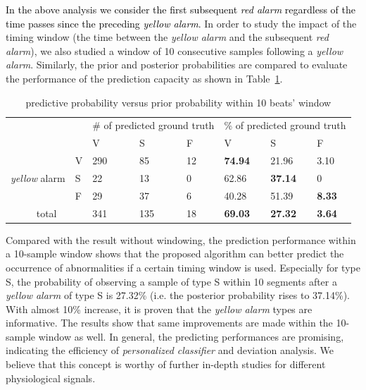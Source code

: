 \textcolor{black}{In the above analysis we consider the first subsequent \textit{red alarm} regardless of the time passes since the preceding \textit{yellow alarm}.} In order to study the impact of the timing window (the time between the \textit{yellow alarm} and the subsequent \textit{red alarm}), we also studied a window of 10 consecutive samples following a \textit{yellow alarm}. Similarly, the prior and posterior probabilities are compared to evaluate the performance of the prediction capacity as shown in Table~\ref{table:pred10}. %


\begin{table}[t]
\centering
\caption{predictive probability versus prior probability within 10 beats' window}
\label{table:pred10}
\begin{tabular}{|c|l|l|l|l||l|l|l|}
\hline
\multicolumn{2}{|l|}{\multirow{2}{*}{}} & \multicolumn{3}{m{8em}|}{\# of predicted ground truth} & \multicolumn{3}{m{8em}|}{\% of predicted ground truth} \\ \cline{3-8} 
\multicolumn{2}{|l|}{}                  & V               & S               & F             & V               & S               & F             \\ \hline
\multirow{3}{2.5em}{\textit{yellow} alarm}    & V    & 290             & 85              & 12            & \textbf{74.94}  & 21.96           & 3.10          \\ \cline{2-8} 
                                 & S    & 22              & 13              & 0             & 62.86           & \textbf{37.14}  & 0             \\ \cline{2-8} 
                                 & F    & 29              & 37              & 6             & 40.28           & 51.39           & \textbf{8.33} \\ \hline
\multicolumn{2}{|c|}{total}             & 341             & 135             & 18            & \textbf{69.03}  & \textbf{27.32}  & \textbf{3.64} \\ \hline
\end{tabular}
\end{table}

Compared with the result without windowing, the prediction performance within a 10-sample window shows that the proposed algorithm can better predict the occurrence of abnormalities if a certain timing window is used. Especially for type S, the probability of observing a sample of type S within 10 segments after a \textit{yellow alarm} of type S is 27.32\% (i.e. the posterior probability rises to 37.14\%). With almost 10\% increase, it is proven that the \textit{yellow alarm} types are informative. The results show that same improvements are made within the 10-sample window as well. In general, the predicting performances are promising, indicating the efficiency of \textit{personalized classifier} and deviation analysis. We believe that this concept is worthy of further in-depth studies for different physiological signals.





